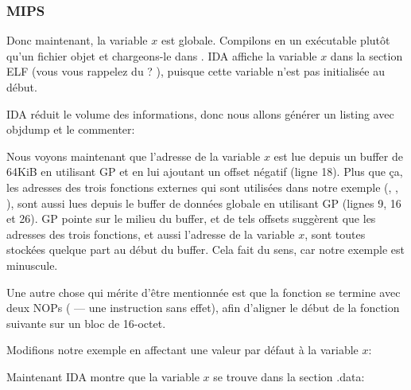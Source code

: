 \subsubsection{MIPS}


Donc maintenant, la variable $x$ est globale.
Compilons en un exécutable plutôt qu'un fichier objet et chargeons-le dans \IDA.
IDA affiche la variable $x$ dans la section ELF  (vous vous rappelez du
? ),
puisque cette variable n'est pas initialisée au début.



IDA réduit le volume des informations, donc nous allons générer un listing avec
objdump et le commenter:



Nous voyons maintenant que l'adresse de la variable $x$ est lue depuis un buffer
de 64KiB en utilisant GP et en lui ajoutant un offset négatif (ligne 18).
Plus que ça, les adresses des trois fonctions externes qui sont utilisées dans
notre exemple (\puts, \scanf, \printf), sont aussi lues depuis le buffer de données
globale en utilisant GP (lignes 9, 16 et 26).
GP pointe sur le milieu du buffer, et de tels offsets suggèrent que les adresses
des trois fonctions, et aussi l'adresse de la variable $x$, sont toutes stockées
quelque part au début du buffer.
Cela fait du sens, car notre exemple est minuscule.


Une autre chose qui mérite d'être mentionnée est que la fonction se termine avec
deux \ac{NOP}s ( --- une instruction sans effet), afin d'aligner
le début de la fonction suivante sur un bloc de 16-octet.


Modifions notre exemple en affectant une valeur par défaut à la variable $x$:



Maintenant IDA montre que la variable $x$ se trouve dans la section .data:

